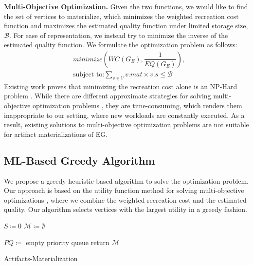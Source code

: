 \textbf{Multi-Objective Optimization.}
Given the two functions, we would like to find the set of vertices to materialize, which minimizes the weighted recreation cost function and maximizes the estimated quality function under limited storage size, $\mathcal{B}$.
For ease of representation, we instead try to minimize the inverse of the estimated quality function.
We formulate the optimization problem as follows:
\begin{equation}\label{multi-obj-opt}
\begin{split}
& minimize(WC(G_E), \dfrac{1}{EQ(G_E)}), \\
& \text{subject to:} \sum\limits_{v \in V} v.mat \times v.s \leq \mathcal{B}
\end{split}
\end{equation}
Existing work proves that minimizing the recreation cost alone is an NP-Hard problem \cite{bhattacherjee2015principles}.
While there are different approximate strategies for solving multi-objective optimization problems \cite{coello2007evolutionary}, they are time-consuming, which renders them inappropriate to our setting, where new workloads are constantly executed.
As a result, existing solutions to multi-objective optimization problems are not suitable for artifact materializations of EG.

\subsection{ML-Based Greedy Algorithm}\label{subsec-ml-based-materialization}
We propose a greedy heuristic-based algorithm to solve the optimization problem.
Our approach is based on the utility function method for solving multi-objective optimizations \cite{emmerich2018tutorial}, where we combine the weighted recreation cost and the estimated quality.
Our algorithm selects vertices with the largest utility in a greedy fashion.
\begin{algorithm}[h]
$S \coloneqq 0$
$\mathcal{M} \coloneqq \emptyset$

$PQ \coloneqq $ empty priority queue\;
return $\mathcal{M}$\;
\caption{Artifacts-Materialization}\label{algorithm-materialization}
\end{algorithm}

